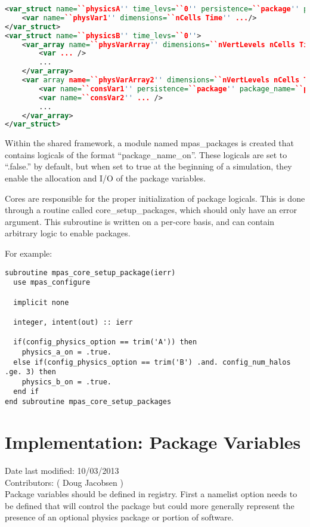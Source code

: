 \documentclass[11pt]{report}
\begin{document}
{\scriptsize
\begin{lstlisting}[language=XML]
<var_struct name=``physicsA'' time_levs=``0'' persistence=``package'' package_name=``package_a''>
	<var name=``physVar1'' dimensions=``nCells Time'' .../>
</var_struct>
<var_struct name=``physicsB'' time_levs=``0''>
	<var_array name=``physVarArray'' dimensions=``nVertLevels nCells Time'' persistence=``package'' package_name=``package_b''>
		<var ... />
		...
	</var_array>
	<var array name=``physVarArray2'' dimensions=``nVertLevels nCells Time''>
		<var name=``consVar1'' persistence=``package'' package_name=``package_b'' ... />
		<var name=``consVar2'' ... />
		...
	</var_array>
</var_struct>
\end{lstlisting}
}

Within the shared framework, a module named mpas\_packages is created that
contains logicals of the format ``package\_name\_on''. These logicals are set
to ``.false.'' by default, but when set to true at the beginning of a
simulation, they enable the allocation and I/O of the package variables. 

Cores are responsible for the proper initialization of package logicals. This
is done through a routine called core\_setup\_packages, which should only have
an error argument. This subroutine is written on a per-core basis, and can
contain arbitrary logic to enable packages.

For example:
{\scriptsize
\begin{lstlisting}
subroutine mpas_core_setup_package(ierr)
  use mpas_configure

  implicit none

  integer, intent(out) :: ierr

  if(config_physics_option == trim('A')) then
    physics_a_on = .true.
  else if(config_physics_option == trim('B') .and. config_num_halos .ge. 3) then
    physics_b_on = .true.
  end if
end subroutine mpas_core_setup_packages
\end{lstlisting}
}


\section{Implementation: Package Variables}
Date last modified: 10/03/2013 \\
Contributors: ( Doug Jacobsen ) \\

Package variables should be defined in registry. First a namelist option needs
to be defined that will control the package but could more generally represent
the presence of an optional physics package or portion of software. 
\end{document}
